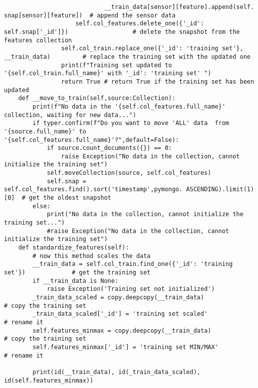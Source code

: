 \begin{verbatim}
                            __train_data[sensor][feature].append(self. snap[sensor][feature])  # append the sensor data
                    self.col_features.delete_one({'_id': self.snap['_id']})                  # delete the snapshot from the features collection
                self.col_train.replace_one({'_id': 'training set'}, __train_data)         # replace the training set with the updated one 
                print(f"Training set updated to '{self.col_train.full_name}' with '_id': 'training set' ")
                return True # return True if the training set has been updated
    def __move_to_train(self,source:Collection):
        print(f"No data in the '{self.col_features.full_name}' collection, waiting for new data...")
        if typer.confirm(f"Do you want to move 'ALL' data  from '{source.full_name}' to '{self.col_features.full_name}'?",default=False):
            if source.count_documents({}) == 0:
                raise Exception("No data in the collection, cannot initialize the training set")
            self.moveCollection(source, self.col_features)
            self.snap = self.col_features.find().sort('timestamp',pymongo. ASCENDING).limit(1)[0]  # get the oldest snapshot
        else:
            print("No data in the collection, cannot initialize the training set...")
            #raise Exception("No data in the collection, cannot initialize the training set")
    def standardize_features(self):
        # now this method scales the data
        __train_data = self.col_train.find_one({'_id': 'training set'})             # get the training set
        if __train_data is None:
            raise Exception('Training set not initialized')
        _train_data_scaled = copy.deepcopy(__train_data)                                   # copy the training set
        _train_data_scaled['_id'] = 'training set scaled'                        # rename it
        self.features_minmax = copy.deepcopy(__train_data)                                   # copy the training set
        self.features_minmax['_id'] = 'training set MIN/MAX'                        # rename it
        
        print(id(__train_data), id(_train_data_scaled), id(self.features_minmax))
        

\end{verbatim}

